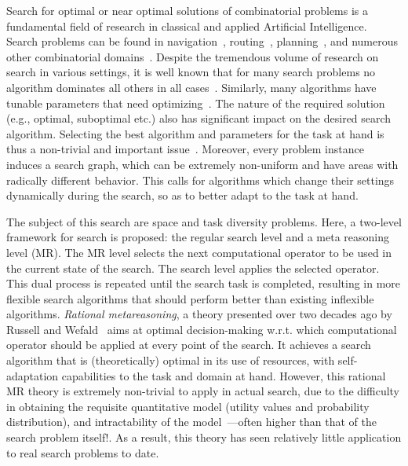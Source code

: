 Search for optimal or near optimal solutions of combinatorial problems
is a fundamental field of research in classical and applied Artificial
Intelligence. Search problems can be found in
navigation~\cite{Kocsis.uct}, routing~\cite{Bellman.routing},
planning~\cite{Domshlak.maxornot}, and numerous other combinatorial
domains~\cite{Korf.partitioning,Braudis.pachi}.  Despite the
tremendous volume of research on search in various settings, it is
well known that for many search problems no algorithm dominates all
others in all cases~\cite{Wolpert.nofree}. Similarly, many algorithms
have tunable parameters that need
optimizing~\cite{Hutter.spo,TolpinShimony.raticomp}. The nature of the
required solution (e.g., optimal, suboptimal etc.) also has
significant impact on the desired search algorithm. Selecting the best
algorithm and parameters for the task at hand is thus a non-trivial
and important issue~\cite{Allen.selheur,Gomes.portfolio}. Moreover, every problem
instance induces a search graph, which can be extremely non-uniform
and have areas with radically different behavior. This calls for
algorithms which change their settings dynamically during the search,
so as to better adapt to the task at hand.

The subject of this search are space and task diversity problems.
Here, a two-level framework for search is proposed: the regular search
level and a meta reasoning level (MR). The MR level selects the next
computational operator to be used in the current state of the
search. The search level applies the selected operator. This dual
process is repeated until the search task is completed, resulting in
more flexible search algorithms that should perform better than
existing inflexible algorithms.  \textit{Rational metareasoning}, a
theory presented over two decades ago by Russell and
Wefald~\cite{Russell.right} aims at optimal decision-making
w.r.t. which computational operator should be applied at every point
of the search. It achieves a search algorithm that is (theoretically)
optimal in its use of resources, with self-adaptation capabilities to
the task and domain at hand. However, this rational MR theory is
extremely non-trivial to apply in actual search, due to the difficulty
in obtaining the requisite quantitative model (utility values and
probability distribution), and intractability of the
model~\cite{Conitzer.complexity}---often higher than that of the
search problem itself!.  As a result, this theory has seen relatively
little application to real search problems to date.

